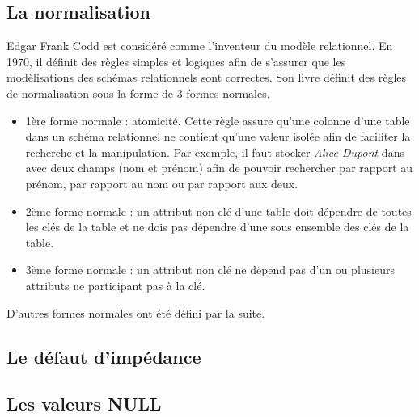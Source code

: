 \subsection{La normalisation}

    Edgar Frank Codd est considéré comme l'inventeur du modèle relationnel. En 1970, il définit des règles simples et logiques afin de s'assurer que les modèlisations des schémas relationnels sont correctes\cite{Wikipedia_Edgar_Frank_Codd}. Son livre définit des règles de normalisation sous la forme de 3 formes normales.

    \begin{itemize}
      \item 1ère forme normale : atomicité. Cette règle assure qu'une colonne d'une table dans un schéma relationnel ne contient qu'une valeur isolée afin de faciliter la recherche et la manipulation. Par exemple, il faut stocker \textit{Alice Dupont} dans avec deux champs (nom et prénom) afin de pouvoir rechercher par rapport au prénom, par rapport au nom ou par rapport aux deux.
      \item 2ème forme normale : un attribut non clé d'une table doit dépendre de toutes les clés de la table et ne dois pas dépendre d'une sous ensemble des clés de la table.
      \item 3ème forme normale : un attribut non clé ne dépend pas d'un ou plusieurs attributs ne participant pas à la clé.
    \end{itemize}

    D'autres formes normales ont été défini par la suite.

\subsection{Le défaut d'impédance}
\subsection{Les valeurs NULL}

